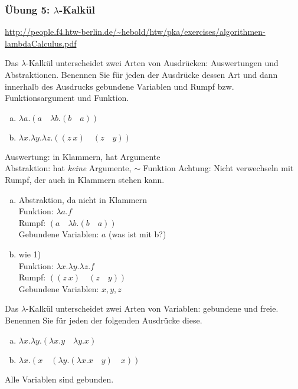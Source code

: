 \begin{card}
	\frametitle{Übung 5: $\lambda$-Kalkül}
	\url{http://people.f4.htw-berlin.de/~hebold/htw/pka/exercises/algorithmen-lambdaCalculus.pdf}
\end{card}

\begin{card}
	Das $\lambda$-Kalkül unterscheidet zwei Arten von Ausdrücken: Auswertungen und Abstraktionen. Benennen Sie für jeden der Ausdrücke dessen Art und dann innerhalb des Ausdrucks gebundene Variablen und Rumpf bzw. Funktionsargument und Funktion. 
	\begin{enumerate}[a)]
	\item $\lambda a.(a \quad \lambda b.(b \quad a))$
	\item $\lambda x.\lambda y.\lambda z.((z \ x) \quad (z \quad y))$
	\end{enumerate}
	\hr
	Auswertung: in Klammern, hat Argumente\\
	Abstraktion: hat \textit{keine} Argumente, $\sim$ Funktion
	Achtung: Nicht verwechseln mit Rumpf, der auch in Klammern stehen kann.
	\begin{enumerate}[a)]
	\item Abstraktion, da nicht in Klammern\\
	Funktion: $\lambda a.f$\\
	Rumpf: $(a \quad \lambda b.(b \quad a))$\\
	Gebundene Variablen: $a$ (was ist mit b?)
	\item wie 1)\\
	Funktion: $\lambda x.\lambda y.\lambda z.f$ \\
	Rumpf: $((z \ x) \quad (z \quad y))$\\
	Gebundene Variablen: $x,y,z$
	\end{enumerate}
\end{card}


\begin{card}
	Das $\lambda$-Kalkül unterscheidet zwei Arten von Variablen: gebundene und freie. Benennen Sie für jeden der folgenden Ausdrücke diese.
	\begin{enumerate}[a)]
	\item $\lambda x.\lambda y.(\lambda x.y \quad \lambda y.x)$
	\item $\lambda x.(x \quad (\lambda y.(\lambda x.x \quad y) \quad x))$
	\end{enumerate}
	\hr
	Alle Variablen sind gebunden.
\end{card}


